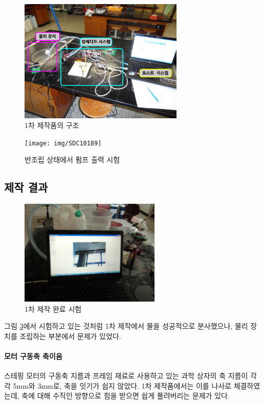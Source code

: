 \documentclass[chapter,11pt,oneside,openany]{xoblivoir}
\begin{document}
\begin{figure}[ht]
\centering
\includegraphics[width=0.70\textwidth]{img/SDC10178}
\caption{1차 제작품의 구조}
\label{img:1a}
\end{figure}

\begin{figure}[ht]
\centering
\texttt{[image: img/SDC10189]}
\caption{반조립 상태에서 펌프 출력 시험}
\label{img:1b}
\end{figure}

\subsection{제작 결과}

\begin{figure}[ht]
\centering
\includegraphics[width=0.6\textwidth]{img/SNC00524}
\caption{1차 제작 완료 시험}
\label{img:1c}
\end{figure}

그림 \ref{img:1c}에서 시험하고 있는 것처럼 1차 제작에서 물을 성공적으로 분사했으나, 물리 장치를 조립하는 부분에서 문제가 있었다.

\paragraph{모터 구동축 축이음}
스테핑 모터의 구동축 지름과 프레임 재료로 사용하고 있는 과학 상자의 축 지름이 각각 5mm와 3mm로, 축을 잇기가 쉽지 않았다.
1차 제작품에서는 이를 나사로 체결하였는데, 축에 대해 수직인 방향으로 힘을 받으면 쉽게 풀려버리는 문제가 있다.
\end{document}
